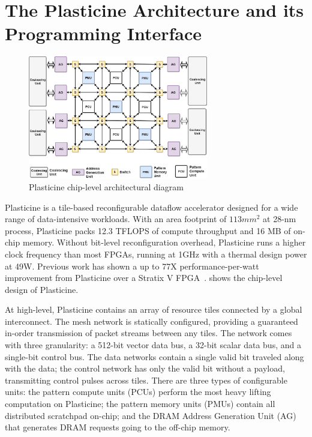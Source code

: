 \section{The Plasticine Architecture and its Programming Interface}

\begin{figure}
\centering
\includegraphics[width=0.7\textwidth]{figs/plasticine.pdf}
\caption[Plasticine chip-level architecture]{Plasticine chip-level architectural diagram}
\label{fig:plasticine}
\end{figure}


Plasticine is a tile-based reconfigurable dataflow accelerator designed for a wide range of data-intensive
workloads.
With an area footprint of $113mm^2$ at 28-nm process, Plasticine packs 12.3 TFLOPS of compute
throughput and 16 MB of on-chip memory. 
Without bit-level reconfiguration overhead,
Plasticine runs a higher clock frequency than most FPGAs, running at 1GHz 
with a thermal design power at 49W. 
Previous work has shown a up to 77X performance-per-watt improvement from Plasticine over a Stratix
V FPGA~\cite{plasticine}.
 shows the chip-level design of Plasticine.

At high-level, Plasticine contains an array of resource tiles connected by a global interconnect.
The mesh network is statically configured, providing a guaranteed in-order transmission
of packet streams between any tiles.
The network comes with three granularity: a 512-bit vector data bus, a 32-bit scalar data bus, and a
single-bit control bus.
The data networks contain a single valid bit traveled along with the data;
the control network has only the valid bit without a payload, transmitting control pulses across tiles.
There are three types of configurable units: the pattern compute units (PCUs) perform the most
heavy lifting computation on Plasticine; the pattern memory units (PMUs) contain all distributed
scratchpad on-chip; and the DRAM Address Generation Unit (AG) that generates DRAM requests going to
the off-chip memory.

